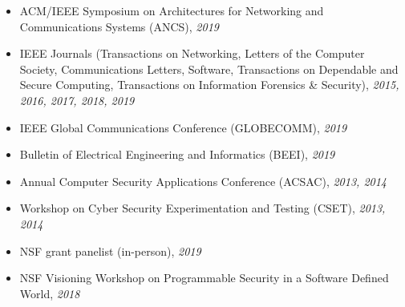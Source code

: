 \documentclass[a4paper,11pt]{article}
\begin{document}
\begin{itemize}[topsep=2pt]
\item{ACM/IEEE Symposium on Architectures for Networking and Communications Systems (ANCS), \textit{2019}}
\item{IEEE Journals (Transactions on Networking, Letters of the Computer Society, Communications Letters, Software, Transactions on Dependable and Secure Computing, Transactions on Information Forensics \& Security), \textit{2015, 2016, 2017, 2018, 2019}}
\item{
IEEE Global Communications Conference (GLOBECOMM), \textit{2019}
}
\item{
Bulletin of Electrical Engineering and Informatics (BEEI), \textit{2019}
}
\item{
Annual Computer Security Applications Conference (ACSAC), \textit{2013, 2014}
}
\item{
Workshop on Cyber Security Experimentation and Testing (CSET), \textit{2013, 2014} 
}
\end{itemize}

\begin{itemize}[topsep=1pt]
\item{
NSF grant panelist (in-person), \textit{2019}
}
\item{
NSF Visioning Workshop on Programmable Security in a Software Defined World, \textit{2018}
}
\end{itemize}
\end{document}
